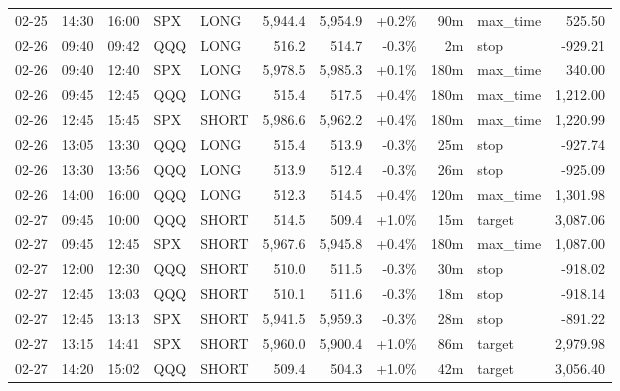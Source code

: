 \documentclass[11pt,a4paper,twoside]{article}
\begin{document}
\begin{center}
\begin{longtable}{>{\color{txtmain}}l l l l l r r r r >{\color{txtmain}}l r}
02-25 & 14:30 & 16:00 & SPX & LONG & 5,944.4 & 5,954.9 & \textcolor{wingreen}{+0.2\%} & 90m & max\_time & \textcolor{wingreen}{525.50} \\
02-26 & 09:40 & 09:42 & QQQ & LONG & 516.2 & 514.7 & \textcolor{lossred}{-0.3\%} & 2m & stop & \textcolor{lossred}{-929.21} \\
02-26 & 09:40 & 12:40 & SPX & LONG & 5,978.5 & 5,985.3 & \textcolor{wingreen}{+0.1\%} & 180m & max\_time & \textcolor{wingreen}{340.00} \\
02-26 & 09:45 & 12:45 & QQQ & LONG & 515.4 & 517.5 & \textcolor{wingreen}{+0.4\%} & 180m & max\_time & \textcolor{wingreen}{1,212.00} \\
02-26 & 12:45 & 15:45 & SPX & SHORT & 5,986.6 & 5,962.2 & \textcolor{wingreen}{+0.4\%} & 180m & max\_time & \textcolor{wingreen}{1,220.99} \\
02-26 & 13:05 & 13:30 & QQQ & LONG & 515.4 & 513.9 & \textcolor{lossred}{-0.3\%} & 25m & stop & \textcolor{lossred}{-927.74} \\
02-26 & 13:30 & 13:56 & QQQ & LONG & 513.9 & 512.4 & \textcolor{lossred}{-0.3\%} & 26m & stop & \textcolor{lossred}{-925.09} \\
02-26 & 14:00 & 16:00 & QQQ & LONG & 512.3 & 514.5 & \textcolor{wingreen}{+0.4\%} & 120m & max\_time & \textcolor{wingreen}{1,301.98} \\
02-27 & 09:45 & 10:00 & QQQ & SHORT & 514.5 & 509.4 & \textcolor{wingreen}{+1.0\%} & 15m & target & \textcolor{wingreen}{3,087.06} \\
02-27 & 09:45 & 12:45 & SPX & SHORT & 5,967.6 & 5,945.8 & \textcolor{wingreen}{+0.4\%} & 180m & max\_time & \textcolor{wingreen}{1,087.00} \\
02-27 & 12:00 & 12:30 & QQQ & SHORT & 510.0 & 511.5 & \textcolor{lossred}{-0.3\%} & 30m & stop & \textcolor{lossred}{-918.02} \\
02-27 & 12:45 & 13:03 & QQQ & SHORT & 510.1 & 511.6 & \textcolor{lossred}{-0.3\%} & 18m & stop & \textcolor{lossred}{-918.14} \\
02-27 & 12:45 & 13:13 & SPX & SHORT & 5,941.5 & 5,959.3 & \textcolor{lossred}{-0.3\%} & 28m & stop & \textcolor{lossred}{-891.22} \\
02-27 & 13:15 & 14:41 & SPX & SHORT & 5,960.0 & 5,900.4 & \textcolor{wingreen}{+1.0\%} & 86m & target & \textcolor{wingreen}{2,979.98} \\
02-27 & 14:20 & 15:02 & QQQ & SHORT & 509.4 & 504.3 & \textcolor{wingreen}{+1.0\%} & 42m & target & \textcolor{wingreen}{3,056.40} \\

\end{longtable}
\end{center}
\end{document}
